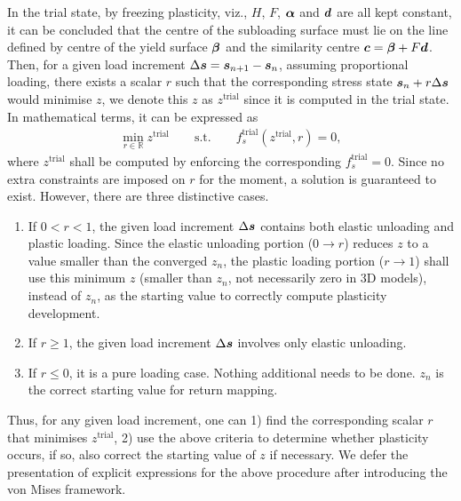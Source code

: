 In the trial state, by freezing plasticity, viz., $H$, $F$, $\bm{\alpha}$ and $\bm{d}$ are all kept constant, it can be concluded that the centre of the subloading surface must lie on the line defined by centre of the yield surface $\bm{\beta}$ and the similarity centre $\bm{c}=\bm{\beta}+F\bm{d}$.
Then, for a given load increment $\Delta\bm{s}=\bm{s}_{n+1}-\bm{s}_n$, assuming proportional loading, there exists a scalar $r$ such that the corresponding stress state $\bm{s}_n+r\Delta\bm{s}$ would minimise $z$, we denote this $z$ as $z^\text{trial}$ since it is computed in the trial state.
In mathematical terms, it can be expressed as
\begin{gather}
    \boxed{\min\limits_{r\in\mathbb{R}}z^\text{trial}\qquad\text{s.t.}\qquad{}f_s^\text{trial}\left(z^\text{trial},r\right)=0,}
\end{gather}
where $z^\text{trial}$ shall be computed by enforcing the corresponding $f_s^\text{trial}=0$.
Since no extra constraints are imposed on $r$ for the moment, a solution is guaranteed to exist.
However, there are three distinctive cases.
\begin{enumerate}
    \item If $0<r<1$, the given load increment $\Delta\bm{s}$ contains both elastic unloading and plastic loading.
          Since the elastic unloading portion ($0\to{}r$) reduces $z$ to a value smaller than the converged $z_n$, the plastic loading portion ($r\to{}1$) shall use this minimum $z$ (smaller than $z_n$, not necessarily zero in 3D models), instead of $z_n$, as the starting value to correctly compute plasticity development.
    \item If $r\geqslant1$, the given load increment $\Delta\bm{s}$ involves only elastic unloading.
    \item If $r\leqslant0$, it is a pure loading case. Nothing additional needs to be done. $z_n$ is the correct starting value for return mapping.
\end{enumerate}
Thus, for any given load increment, one can 1) find the corresponding scalar $r$ that minimises $z^\text{trial}$, 2) use the above criteria to determine whether plasticity occurs, if so, also correct the starting value of $z$ if necessary.
We defer the presentation of explicit expressions for the above procedure after introducing the von Mises framework.
